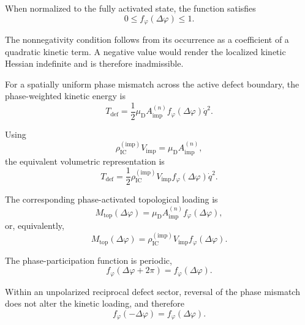 When normalized to the fully activated state, the function satisfies
\begin{equation}
    0 \leq f_{\varphi}(\Delta\varphi) \leq 1.
\end{equation}

The nonnegativity condition follows from its occurrence as a coefficient of a quadratic kinetic term. A negative value would render the localized kinetic Hessian indefinite and is therefore inadmissible.

For a spatially uniform phase mismatch across the active defect boundary, the phase-weighted kinetic energy is
\begin{equation}
    T_{\mathrm{def}} = \frac{1}{2} \mu_{\mathrm{D}} A_{\mathrm{imp}}^{(n)} f_{\varphi}(\Delta\varphi) \dot{q}^2.
\end{equation}

Using
\begin{equation}
    \rho_{\mathrm{IC}}^{(\mathrm{imp})} V_{\mathrm{imp}} = \mu_{\mathrm{D}} A_{\mathrm{imp}}^{(n)},
\end{equation}
the equivalent volumetric representation is
\begin{equation}
    T_{\mathrm{def}} = \frac{1}{2} \rho_{\mathrm{IC}}^{(\mathrm{imp})} V_{\mathrm{imp}} f_{\varphi}(\Delta\varphi) \dot{q}^2.
\end{equation}

The corresponding phase-activated topological loading is
\begin{equation}
    M_{\mathrm{top}}(\Delta\varphi) = \mu_{\mathrm{D}} A_{\mathrm{imp}}^{(n)} f_{\varphi}(\Delta\varphi),
\end{equation}
or, equivalently,
\begin{equation}
    M_{\mathrm{top}}(\Delta\varphi) = \rho_{\mathrm{IC}}^{(\mathrm{imp})} V_{\mathrm{imp}} f_{\varphi}(\Delta\varphi).
\end{equation}

The phase-participation function is periodic,
\begin{equation}
    f_{\varphi}(\Delta\varphi+2\pi) = f_{\varphi}(\Delta\varphi).
\end{equation}

Within an unpolarized reciprocal defect sector, reversal of the phase mismatch does not alter the kinetic loading, and therefore
\begin{equation}
    f_{\varphi}(-\Delta\varphi) = f_{\varphi}(\Delta\varphi).
\end{equation}

